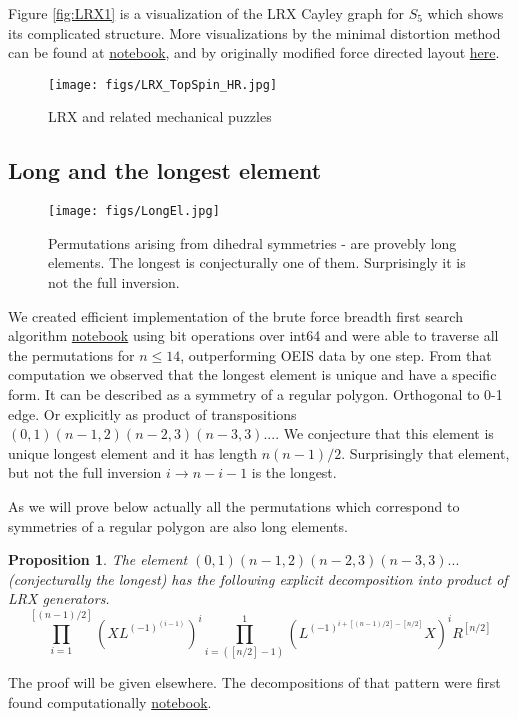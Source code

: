 \documentclass[atmp]{ipart_v1}
\numberwithin{equation}{section}
\theoremstyle{plain}%
\newtheorem{proposition}[theorem]{Proposition}
\begin{document}
Figure \ref{fig:LRX1} is a visualization of the LRX Cayley graph for $S_5$ which shows its complicated structure. More visualizations by the minimal distortion method  can be found at \href{https://www.kaggle.com/code/iggisv9t/drawing-cayley-graphs-with-mds}{notebook}, and by originally modified force directed layout \href{https://projects.interacta.io/graphs/IM_S_N_4.csv}{here}.

\begin{figure}[h!]
   \centering
   \texttt{[image: figs/LRX\_TopSpin\_HR.jpg]}
   \caption{LRX and related mechanical puzzles}\label{fig:LRX_TopSpin_HR}
\end{figure}


\subsection{Long and the longest element}

\begin{figure}[h!]
   \centering
   \texttt{[image: figs/LongEl.jpg]}
   \caption{Permutations arising from dihedral symmetries - are provebly long elements. The longest is conjecturally one of them. Surprisingly it is not the full inversion.}\label{fig:LongEl}
\end{figure}

We created efficient implementation of the brute force breadth first search algorithm \href{https://www.kaggle.com/code/ivankolt/lrx-4bit-uint64}{notebook} using bit operations over int64 and were able to traverse all the permutations for $n \le 14$, outperforming OEIS data by one step. From that computation we observed that the longest element is unique and have a specific form. It can be described as a symmetry of a regular polygon. Orthogonal to 0-1 edge. Or explicitly as product of transpositions $(0,1)(n-1,2)(n-2,3)(n-3,3)...$. We conjecture that this element is unique longest element and it has length $n(n-1)/2$. 
Surprisingly that element, but not the full inversion $i\to n-i-1$ is the longest. 

As we will prove below actually all the permutations which correspond to  symmetries of a regular polygon are also long elements.  


\begin{proposition}
    The element $(0,1)(n-1,2)(n-2,3)(n-3,3)...$ (conjecturally the longest)
    has the following explicit decomposition into product of LRX generators.
\begin{equation}
\label{eq:long}
\prod_{i=1}^{[ (n-1)/2]} ( X L^{(-1)^{(i-1)}} )^i 
\prod_{i=([ n/2]-1)}^{1} (L^{(-1)^{i+[(n-1)/2] - [n/2] }} X )^i R^{[n/2]}
\end{equation}    
\end{proposition}
The proof will be given elsewhere. The decompositions of that pattern were first found computationally \href{https://www.kaggle.com/code/luxoove/lrx-optimal-algorithm-two-ways-bubble-sort}{notebook}.
\end{document}
